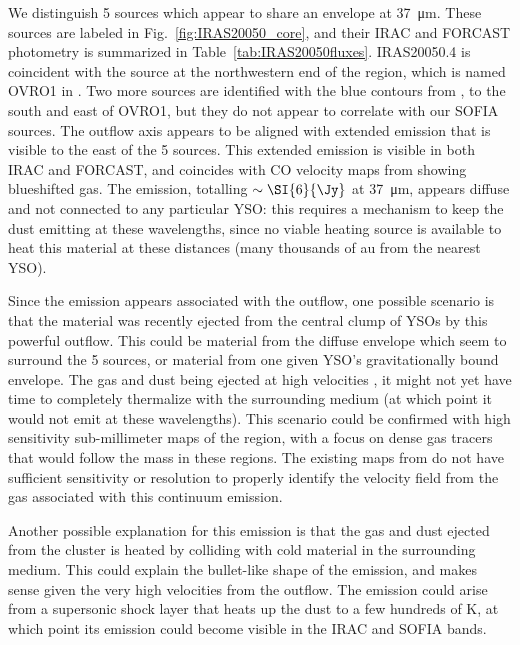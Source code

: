 We distinguish 5 sources which appear to share an envelope at \SI{37}{\um}. These sources are labeled in Fig.~\ref{fig:IRAS20050_core}, and their IRAC and FORCAST photometry is summarized in Table~\ref{tab:IRAS20050fluxes}. IRAS20050.4 is coincident with the source at the northwestern end of the region, which is named OVRO1 in \citet{Beltran:2008gu}. Two more sources are identified with the blue contours from \citet{Beltran:2008gu}, to the south and east of OVRO1, but they do not appear to correlate with our SOFIA sources. The outflow axis \citep[Outflow "A",][]{Bachiller:1995cy} appears to be aligned with extended emission that is visible to the east of the 5 sources. This extended emission is visible in both IRAC and FORCAST, and coincides with CO velocity maps from \citet{Beltran:2008gu} showing blueshifted gas. The emission, totalling $\sim\SI{6}{\Jy}$ at \SI{37}{\um}, appears diffuse and not connected to any particular YSO: this requires a mechanism to keep the dust emitting at these wavelengths, since no viable heating source is available to heat this material at these distances (many thousands of au from the nearest YSO).

Since the emission appears associated with the outflow, one possible scenario is that  the material was recently ejected from the central clump of YSOs by this powerful outflow. This could be material from the diffuse envelope which seem to surround the 5 sources, or material from one given YSO's gravitationally bound envelope. The gas and dust being ejected at high velocities \citep{Bachiller:1995cy}, it might not yet have time to completely thermalize with the surrounding medium (at which point it would not emit at these wavelengths). This scenario could be confirmed with high sensitivity sub-millimeter maps of the region, with a focus on dense gas tracers that would follow the mass in these regions. The existing maps from \citet{Beltran:2008gu} do not have sufficient sensitivity or resolution to properly identify the velocity field from the gas associated with this continuum emission.

Another possible explanation for this emission is that the gas and dust ejected from the cluster is heated by colliding with cold material in the surrounding medium. This could explain the bullet-like shape of the emission, and makes sense given the very high velocities from the outflow. The emission could arise from a supersonic shock layer that heats up the dust to a few hundreds of K, at which point its emission could become visible in the IRAC and SOFIA bands. 

